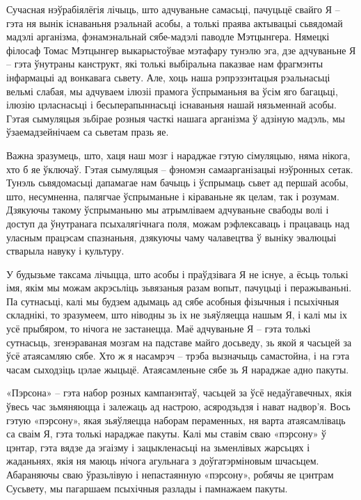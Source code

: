 Сучасная нэўрабіялёгія лічыць, што адчуваньне самасьці, пачуцьцё свайго Я – гэта ня вынік існаваньня рэальнай асобы, а толькі праява актывацыі сьвядомай мадэлі арганізма, фэнамэнальнай сябе-мадэлі паводле Мэтцынгера. Нямецкі філосаф Томас Мэтцынгер выкарыстоўвае мэтафару тунэлю эга, дзе адчуваньне Я – гэта ўнутраны канструкт, які толькі выбіральна паказвае нам фрагмэнты інфармацыі ад вонкавага сьвету. Але, хоць наша рэпрэзэнтацыя рэальнасьці вельмі слабая, мы адчуваем ілюзіі прамога ўспрыманьня ва ўсім яго багацьці, ілюзію цэласнасьці і бесьперапыннасьці існаваньня нашай нязьменнай асобы. Гэтая сымуляцыя зьбірае розныя часткі нашага арганізма ў адзіную мадэль, мы ўзаемадзейнічаем са сьветам празь яе.

Важна зразумець, што, хаця наш мозг і нараджае гэтую сімуляцыю, няма нікога, хто б яе ўключаў. Гэтая сымуляцыя – фэномэн самаарганізацыі нэўронных сетак. Тунэль сьвядомасьці дапамагае нам бачыць і ўспрымаць сьвет ад першай асобы, што, несумненна, палягчае ўспрыманьне і кіраваньне як целам, так і розумам. Дзякуючы такому ўспрыманьню мы атрымліваем адчуваньне свабоды волі і доступ да ўнутранага псыхалягічнага поля, можам рэфлексаваць і працаваць над уласным працэсам спазнаньня, дзякуючы чаму чалавецтва ў выніку эвалюцыі стварыла навуку і культуру.

У будызьме таксама лічыцца, што асобы і праўдзівага Я не існуе, а ёсьць толькі імя, якім мы можам акрэсьліць зьвязаныя разам вопыт, пачуцьці і перажываньні. Па сутнасьці, калі мы будзем адымаць ад сябе асобныя фізычныя і псыхічныя складнікі, то зразумеем, што ніводны зь іх не зьяўляецца нашым Я, і калі мы іх усё прыбяром, то нічога не застанецца. Маё адчуваньне Я – гэта толькі сутнасьць, згенэраваная мозгам на падставе майго досьведу, зь якой я часьцей за ўсё атаясамляю сябе. Хто ж я насамрэч – трэба вызначыць самастойна, і на гэта часам сыходзіць цэлае жыцьцё. Атаясамленьне сябе зь Я нараджае адно пакуты.

«Пэрсона» – гэта набор розных кампанэнтаў, часьцей за ўсё недаўгавечных, якія ўвесь час зьмяняюцца і залежаць ад настрою, асяродзьдзя і нават надвор'я. Вось гэтую «пэрсону», якая зьяўляецца наборам пераменных, ня варта атаясамліваць са сваім Я, гэта толькі нараджае пакуты. Калі мы ставім сваю «пэрсону» ў цэнтар, гэта вядзе да эгаізму і зацыкленасьці на зьменлівых жарсьцях і жаданьнях, якія ня маюць нічога агульнага з доўгатэрміновым шчасьцем. Абараняючы сваю ўразьлівую і непастаянную «пэрсону», робячы яе цэнтрам Сусьвету, мы пагаршаем псыхічныя разлады і памнажаем пакуты.

